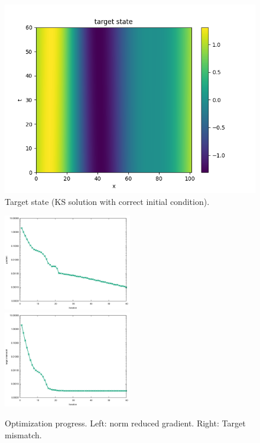 \documentclass[a4paper]{article} %
\begin{document}
\begin{figure}
	\includegraphics[scale=0.7]{figures/solKS_T1_nstep100_nx1024_yd.png}
	\caption{Target state (KS solution with correct initial condition).}
	\label{fig:yd}
\end{figure}

\begin{figure}
	\includegraphics[width=0.5\textwidth]{figures/gradientKS_T1_nstep100_nx1024_u0_075uexact_progress.pdf}
	\includegraphics[width=0.5\textwidth]{figures/objKS_T1_nstep100_nx1024_u0_075uexact_progress.pdf}
	\caption{Optimization progress. Left: norm reduced gradient. Right: Target mismatch.}
	\label{fig:optprogress}
\end{figure}
\end{document}
